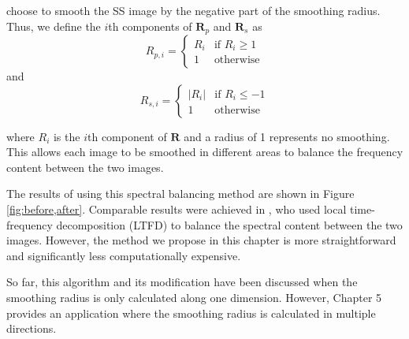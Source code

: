         choose to smooth the SS image by the negative part of the smoothing radius. 
        Thus, we define the $i$th components of $\mathbf{R}_p$ and $\mathbf{R}_s$ as
        \begin{equation}
                R_{p,i} = \begin{cases} R_{i} &\mbox{if } R_{i} \ge 1 \\
        1 & \mbox{otherwise} \end{cases} 
        \end{equation}
        and
        \begin{equation}
                R_{s,i} = \begin{cases} |R_{i}| &\mbox{if } R_{i} \le -1 \\
        1 & \mbox{otherwise} \end{cases} 
        \end{equation}

        where $R_i$ is the $i$th component of $\mathbf{R}$ and a radius of 1 represents no
        smoothing. This allows each image to be smoothed in different areas to balance the frequency
        content between the two images.


        The results of using this spectral balancing method are shown in Figure
        \ref{fig:before,after}. Comparable results were achieved in \cite{ltft}, who used local time-frequency decomposition (LTFD) to
        balance the spectral content between the two images. However, the method we propose in this
        chapter is more straightforward and significantly less computationally expensive.

        So far, this algorithm and its modification have been discussed when the smoothing radius is only calculated along one dimension. 
        However, Chapter 5 provides an application where the smoothing radius is calculated in multiple directions.

        
